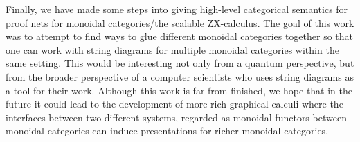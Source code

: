 \documentclass[12pt]{ociamthesis}  %
\begin{document}
Finally, we have made some steps into giving high-level categorical semantics for proof nets for monoidal categories/the scalable ZX-calculus.  The goal of this work was to attempt to find ways to glue different monoidal categories together so that one can work with string diagrams for multiple monoidal categories within the same setting.  This would be interesting not only from a quantum perspective, but from the broader perspective of a computer scientists who uses string diagrams as a tool for their work.  Although this work is far from finished, we hope that in the future it could lead to the development of more rich graphical calculi where the interfaces between two different systems, regarded as monoidal functors between monoidal categories can induce presentations for richer monoidal categories.









\end{document}
